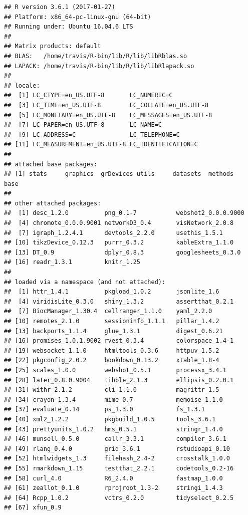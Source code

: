 \documentclass[]{article}
\begin{document}
\begin{verbatim}
## R version 3.6.1 (2017-01-27)
## Platform: x86_64-pc-linux-gnu (64-bit)
## Running under: Ubuntu 16.04.6 LTS
## 
## Matrix products: default
## BLAS:   /home/travis/R-bin/lib/R/lib/libRblas.so
## LAPACK: /home/travis/R-bin/lib/R/lib/libRlapack.so
## 
## locale:
##  [1] LC_CTYPE=en_US.UTF-8       LC_NUMERIC=C              
##  [3] LC_TIME=en_US.UTF-8        LC_COLLATE=en_US.UTF-8    
##  [5] LC_MONETARY=en_US.UTF-8    LC_MESSAGES=en_US.UTF-8   
##  [7] LC_PAPER=en_US.UTF-8       LC_NAME=C                 
##  [9] LC_ADDRESS=C               LC_TELEPHONE=C            
## [11] LC_MEASUREMENT=en_US.UTF-8 LC_IDENTIFICATION=C       
## 
## attached base packages:
## [1] stats     graphics  grDevices utils     datasets  methods   base     
## 
## other attached packages:
##  [1] desc_1.2.0          png_0.1-7           webshot2_0.0.0.9000
##  [4] chromote_0.0.0.9001 networkD3_0.4       visNetwork_2.0.8   
##  [7] igraph_1.2.4.1      devtools_2.2.0      usethis_1.5.1      
## [10] tikzDevice_0.12.3   purrr_0.3.2         kableExtra_1.1.0   
## [13] DT_0.9              dplyr_0.8.3         googlesheets_0.3.0 
## [16] readr_1.3.1         knitr_1.25         
## 
## loaded via a namespace (and not attached):
##  [1] httr_1.4.1          pkgload_1.0.2       jsonlite_1.6       
##  [4] viridisLite_0.3.0   shiny_1.3.2         assertthat_0.2.1   
##  [7] BiocManager_1.30.4  cellranger_1.1.0    yaml_2.2.0         
## [10] remotes_2.1.0       sessioninfo_1.1.1   pillar_1.4.2       
## [13] backports_1.1.4     glue_1.3.1          digest_0.6.21      
## [16] promises_1.0.1.9002 rvest_0.3.4         colorspace_1.4-1   
## [19] websocket_1.1.0     htmltools_0.3.6     httpuv_1.5.2       
## [22] pkgconfig_2.0.2     bookdown_0.13.2     xtable_1.8-4       
## [25] scales_1.0.0        webshot_0.5.1       processx_3.4.1     
## [28] later_0.8.0.9004    tibble_2.1.3        ellipsis_0.2.0.1   
## [31] withr_2.1.2         cli_1.1.0           magrittr_1.5       
## [34] crayon_1.3.4        mime_0.7            memoise_1.1.0      
## [37] evaluate_0.14       ps_1.3.0            fs_1.3.1           
## [40] xml2_1.2.2          pkgbuild_1.0.5      tools_3.6.1        
## [43] prettyunits_1.0.2   hms_0.5.1           stringr_1.4.0      
## [46] munsell_0.5.0       callr_3.3.1         compiler_3.6.1     
## [49] rlang_0.4.0         grid_3.6.1          rstudioapi_0.10    
## [52] htmlwidgets_1.3     filehash_2.4-2      crosstalk_1.0.0    
## [55] rmarkdown_1.15      testthat_2.2.1      codetools_0.2-16   
## [58] curl_4.0            R6_2.4.0            fastmap_1.0.0      
## [61] zeallot_0.1.0       rprojroot_1.3-2     stringi_1.4.3      
## [64] Rcpp_1.0.2          vctrs_0.2.0         tidyselect_0.2.5   
## [67] xfun_0.9
\end{verbatim}
\end{document}
